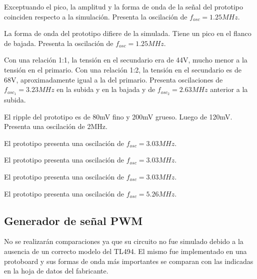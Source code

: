 
Exceptuando el pico, la amplitud y la forma de onda de la señal del prototipo coinciden respecto a la simulación.
Presenta la oscilación de $f_{osc}=1.25MHz$. 


La forma de onda del prototipo difiere de la simulada. 
Tiene un pico en el flanco de bajada. 
Presenta la oscilación de $f_{osc}=1.25MHz$. 


Con una relación 1:1, la tensión en el secundario era de 44V, mucho menor a la tensión en el primario. 
Con una relación 1:2, la tensión en el secundario es de 68V, aproximadamente igual a la del primario.
Presenta oscilaciones de $f_{osc_{1}}=3.23MHz$ en la subida y en la bajada y de $f_{osc_{2}}=2.63MHz$ anterior a la subida. 


El ripple del prototipo es de 80mV fino y 200mV grueso. 
Luego de 120mV. Presenta una oscilación de 2MHz. 


El prototipo presenta una oscilación de $f_{osc}=3.03MHz$. 


El prototipo presenta una oscilación de $f_{osc}=3.03MHz$. 


El prototipo presenta una oscilación de $f_{osc}=3.03MHz$. 


El prototipo presenta una oscilación de $f_{osc}=5.26MHz$.

\subsection{Generador de señal PWM}

No se realizarán comparaciones ya que su circuito no fue simulado debido a la ausencia de un correcto modelo del TL494.
El mismo fue implementado en una protoboard y sus formas de onda más importantes se comparan con las indicadas en la hoja de datos del fabricante.

